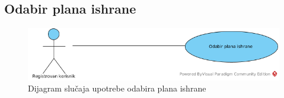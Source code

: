 \subsection{Odabir plana ishrane}

\begin{figure}[H]
\begin{center}
\includegraphics[width=\textwidth]{Pictures/uc_select_meal_plan.png}
\end{center}
    \caption{Dijagram slučaja upotrebe odabira plana ishrane}
\label{fig:UCSelectMealPlan}
\end{figure}

